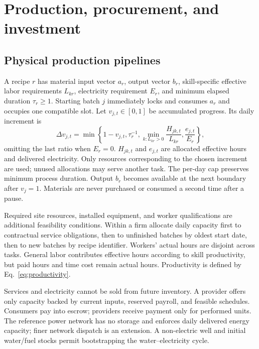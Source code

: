 \documentclass[10pt,a4paper,twocolumn]{article}
\begin{document}
\section{Production, procurement, and investment}
\subsection{Physical production pipelines}
A recipe $r$ has material input vector $a_r$, output vector $b_r$,
skill-specific effective labor requirements $L_{kr}$, electricity
requirement $E_r$, and minimum elapsed duration $\tau_r\geq1$.
Starting batch $j$ immediately locks and consumes $a_r$ and occupies one
compatible slot. Let $v_{j,t}\in[0,1]$ be accumulated progress. Its daily
increment is
\begin{equation}
 \Delta v_{j,t}=\min\left\{1-v_{j,t},\tau_r^{-1},
 \min_{k:L_{kr}>0}\frac{H_{jk,t}}{L_{kr}},
 \frac{e_{j,t}}{E_r}\right\},
 \label{eq:progress}
\end{equation}
omitting the last ratio when $E_r=0$. $H_{jk,t}$ and $e_{j,t}$ are
allocated effective hours and delivered electricity. Only resources
corresponding to the chosen increment are used; unused allocations may
serve another task. The per-day cap preserves minimum process duration.
Output $b_r$ becomes available at the next boundary after $v_j=1$.
Materials are never purchased or consumed a second time after a pause.

Required site resources, installed equipment, and worker qualifications
are additional feasibility conditions. Within a firm allocate daily
capacity first to contractual service obligations, then to unfinished
batches by oldest start date, then to new batches by recipe identifier.
Workers' actual hours are disjoint across tasks. General labor contributes
effective hours according to skill productivity, but paid hours and time
cost remain actual hours. Productivity is defined by Eq.~\eqref{eq:productivity}.

Services and electricity cannot be sold from future inventory. A provider
offers only capacity backed by current inputs, reserved payroll, and
feasible schedules. Consumers pay into escrow; providers receive payment
only for performed units. The reference power network has no storage and
enforces daily delivered energy capacity; finer network dispatch is an
extension. A non-electric well and initial water/fuel stocks permit
bootstrapping the water--electricity cycle.
\end{document}
